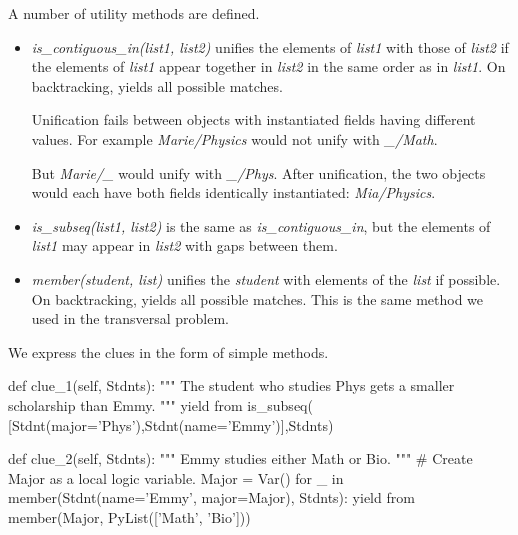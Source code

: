 A number of utility methods are defined.
\begin{itemize}
    \item \textit{is\_contiguous\_in(list1, list2)} unifies the elements of \textit{list1} with those of \textit{list2} if the elements of \textit{list1} appear together in \textit{list2} in the same order as in \textit{list1}. On backtracking, yields all possible matches. 
    
    \smallv
    Unification fails between objects with instantiated fields having different values. For example \textit{Marie/Physics} would not unify with \textit{\_/Math}.
    
    \smallv
    But \textit{Marie/\_} would unify with \textit{\_/Phys}. After unification, the two objects would each have both fields identically instantiated: \textit{Mia/Physics}.
    
    \item \textit{is\_subseq(list1, list2)} is the same as \textit{is\_contiguous\_in}, but the elements of \textit{list1} may appear in \textit{list2} with gaps between them.
    \item \textit{member(student, list)} unifies the \textit{student} with elements of the \textit{list} if possible. On backtracking, yields all possible matches. This is the same method we used in the transversal problem.
\end{itemize}

We express the clues in the form of simple methods. 

\begin{minipage}[c]{0.45\textwidth}
\begin{python1}
def clue_1(self, Stdnts):
  """ The student who studies Phys gets a 
      smaller scholarship than Emmy. """
  yield from is_subseq(
    [Stdnt(major='Phys'),Stdnt(name='Emmy')],Stdnts)
\end{python1}
\end{minipage}

\begin{minipage}[c]{0.45\textwidth}
\begin{python1}
def clue_2(self, Stdnts):
  """ Emmy studies either Math or Bio. """
  # Create Major as a local logic variable.
  Major = Var()
  for _ in member(Stdnt(name='Emmy', major=Major), 
                  Stdnts):
    yield from member(Major, PyList(['Math', 
                                     'Bio']))
\end{python1}
\end{minipage}

